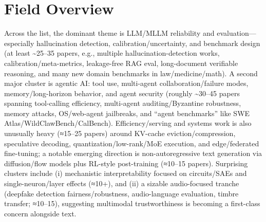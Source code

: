 \documentclass[12pt,letterpaper]{article}
\begin{document}
\medskip



\section*{Field Overview}
{\footnotesize Across the list, the dominant theme is LLM/MLLM reliability and evaluation---especially hallucination detection, calibration/uncertainty, and benchmark design (at least \textasciitilde{}25--35 papers, e.g., multiple hallucination-detection works, calibration/meta-metrics, leakage-free RAG eval, long-document verifiable reasoning, and many new domain benchmarks in law/medicine/math). A second major cluster is agentic AI: tool use, multi-agent collaboration/failure modes, memory/long-horizon behavior, and agent security (roughly \textasciitilde{}30--45 papers spanning tool-calling efficiency, multi-agent auditing/Byzantine robustness, memory attacks, OS/web-agent jailbreaks, and ``agent benchmarks'' like SWE Atlas/WildClawBench/CalBench). Efficiency/serving and systems work is also unusually heavy (≈15--25 papers) around KV-cache eviction/compression, speculative decoding, quantization/low-rank/MoE execution, and edge/federated fine-tuning; a notable emerging direction is non-autoregressive text generation via diffusion/flow models plus RL-style post-training (≈10--15 papers). Surprising clusters include (i) mechanistic interpretability focused on circuits/SAEs and single-neuron/layer effects (≈10+), and (ii) a sizable audio-focused tranche (deepfake detection fairness/robustness, audio-language evaluation, timbre transfer; ≈10--15), suggesting multimodal trustworthiness is becoming a first-class concern alongside text.}
\end{document}
